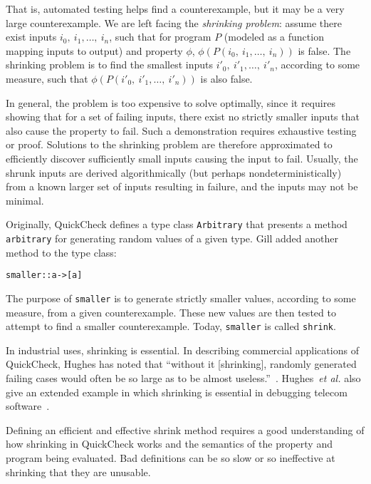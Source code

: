 \documentclass{sigplanconf}
\newenvironment{code}{\begin{alltt}\footnotesize}{\end{alltt}}
\newcommand{\ttp}[1]{\texttt{#1}}
\begin{document}
That is, automated testing helps find a counterexample, but it may be a very
large counterexample.  We are left facing the \emph{shrinking problem}: assume
there exist inputs $i_0, \ i_1, \ldots, \ i_n$, such that for program
$P$ (modeled as a function mapping inputs to output) and property $\phi$,
$\phi(P(i_0, \ i_1, \ldots, \ i_n))$ is false.  The shrinking problem is to find
the smallest inputs $i'_0, \ i'_1, \ldots, \ i'_n$, according to some
measure, such that $\phi(P(i'_0, \ i'_1, \ldots, \ i'_n))$ is also false.

In general, the problem is too expensive to solve optimally, since it requires
showing that for a set of failing inputs, there exist no strictly smaller inputs
that also cause the property to fail.  Such a demonstration requires exhaustive
testing or proof.  Solutions to the shrinking problem are therefore approximated
to efficiently discover sufficiently small inputs causing the input to fail.
Usually, the shrunk inputs are derived algorithmically (but perhaps
nondeterministically) from a known larger set of inputs resulting in failure,
and the inputs may not be minimal.

Originally, QuickCheck defines a type class
\ttp{Arbitrary} that presents a method \ttp{arbitrary} for generating random
values of a given type.  Gill added another method to the type class:
%
\begin{code}
smaller :: a -> [a]
\end{code}
%
\noindent
The purpose of \ttp{smaller} is to generate strictly smaller values, according
to some measure, from a given counterexample.  These new values are then tested
to attempt to find a smaller counterexample.  Today, \ttp{smaller} is called
\ttp{shrink}.

In industrial uses, shrinking is essential.  In describing commercial
applications of QuickCheck, Hughes has noted that ``without it [shrinking],
randomly generated failing cases would often be so large as to be almost
useless.''~\cite{qcjh}.  Hughes~\emph{et al.} also give an extended example in
which shrinking is essential in debugging telecom software~\cite{telecom}.

Defining an efficient and effective shrink method requires a good understanding
of how shrinking in QuickCheck works and the semantics of the property and
program being evaluated.  Bad definitions can be so slow or so ineffective at
shrinking that they are unusable.
\end{document}
